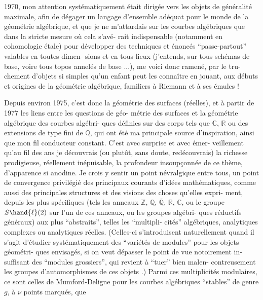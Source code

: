 
1970, mon attention systématiquement était dirigée vers les objets
de généralité maximale, afin de dégager un langage d'ensemble adéquat
pour le monde de la géométrie algébrique, et que je ne m'attardais
sur les courbes algébriques que dans la stricte mesure où cela s'avé-%
rait indispensable (notamment en cohomologie étale) pour développer
des techniques et énoncés ``passe-partout'' valables en toutes dimen-%
sions et en tous lieux (j'entends, sur tous schémas de base, voire
tous topos annelés de base ...), me voici donc ramené, par le tru-%
chement d'objets si simples qu'un enfant peut les connaître en jouant,
aux débuts et origines de la géométrie algébrique, familiers à Riemann
et à ses émules !

Depuis environ 1975, c'est donc la géométrie des surfaces
(réelles), et à partir de 1977 les liens entre les questions de géo-%
métrie des surfaces et la géométrie algébrique des courbes algébri-%
ques définies sur des corps tels que $\mathbb{C}$, $\mathbb{R}$ ou des extensions de type
fini de $\mathbb{Q}$, qui ont été ma principale source d'inspiration, ainsi
que mon fil conducteur constant. C'est avec surprise et avec émer-%
veillement qu'au fil des ans je découvrais (ou plutôt, sans doute,
redécouvrais) la richesse prodigieuse, réellement inépuisable, la
profondeur insoupçonnée de ce thème, d'apparence si anodine. Je crois
y sentir un point névralgique entre tous, un point de convergence
privilégié des principaux courants d'idées mathématiques, comme aussi
des principales structures et des visions des choses qu'elles expri-%
ment, depuis les plus spécifiques (tels les anneaux $\mathbb{Z}$, $\mathbb{Q}$, $\bar{\mathbb{Q}}$, $\mathbb{R}$, $\mathbb{C}$,
ou le groupe $S\hand{\ell}(2)$ sur l'un de ces anneaux, ou les groupes algébri-%
ques réductifs généraux) aux plus ``abstraits'', telles les ``multipli-%
cités'' algébriques, analytiques complexes ou analytiques réelles.
(Celles-ci s'introduisent naturellement quand il s'agit d'étudier
systématiquement des ``variétés de modules'' pour les objets géométri-%
ques envisagés, si on veut dépasser le point de vue notoirement in-%
suffisant des ``modules grossiers'', qui revient à ``tuer'' bien malen-%
contreusement les groupes d'automorphismes de ces objets .) Parmi ces
multiplicités modulaires, ce sont celles de Mumford-Deligne pour les
courbes algébriques ``stables'' de genre $g$, à $\nu$ points marqués, que

